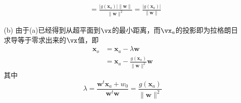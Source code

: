 \documentclass[reportComp]{thesis}
\begin{document}
\begin{answer}[\textsection 5 Q4]
\begin{itemize}
\[\begin{aligned}
	&=\frac{\left|g\left(\mathbf{x}_{a}\right)\right|\|\mathbf{w}\|}{\|\mathbf{w}\|^{2}}=\frac{\left|g\left(\mathbf{x}_{a}\right)\right|}{\|\mathbf{w}\|}
	\end{aligned}\]
	\item [(b)] 由于(a)已经得到从超平面到$\vx$的最小距离，而$\vx_a$的投影即为拉格朗日求导等于零求出来的$\vx$值，即
	\[\begin{aligned}
	\mathbf{x}_{o} &=\mathbf{x}_{a}-\lambda \mathbf{w} \\
	&=\mathbf{x}_{a}-\frac{g\left(\mathbf{x}_{a}\right)}{\|\mathbf{w}\|^{2}} \mathbf{w}
	\end{aligned}\]
	其中
	\[\lambda=\frac{\mathbf{w}^{t} \mathbf{x}_{a}+w_{0}}{\mathbf{w}^{t} \mathbf{w}}=\frac{g\left(\mathbf{x}_{a}\right)}{\|\mathbf{w}\|^{2}}\]
\end{itemize}
\end{answer}
\end{document}
